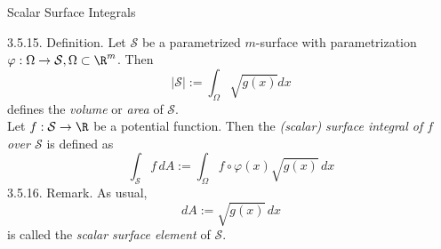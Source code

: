 \documentclass[smaller,hyperref={CJKbookmarks=true}]{beamer}
\begin{document}
\begin{frame}[t]{Scalar Surface Integrals}
\begin{spacing}{1.2}
\alert{3.5.15. Definition.} Let $\mathcal{S}$ be a parametrized $m$-surface with parametrization $\varphi:\Omega\to\mathcal{S},\Omega\subset\R^m$. Then
\[|\mathcal{S}|:=\int_\Omega\sqrt{g(x)}dx\]
defines the \emph{volume} or \emph{area} of $\mathcal{S}$.\\[4pt]
Let $f:\mathcal{S}\to\R$ be a potential function. Then the \emph{(scalar) surface integral of $f$ over $\mathcal{S}$} is defined as
\[\int_\mathcal{S}f\,dA:=\int_\Omega f\circ\varphi(x)\sqrt{g(x)}\,dx\]
\alert{3.5.16. Remark.} As usual,
\[dA:=\sqrt{g(x)}\,dx\]
is called the \emph{scalar surface element} of $\mathcal{S}$.
\end{spacing}
\end{frame}
\end{document}
